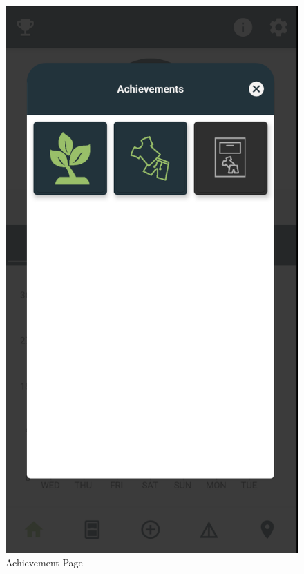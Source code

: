 \documentclass[a4paper, 11pt]{article}
\begin{document}
        \begin{figure}[!htbp]
          \begin{minipage}[scale=0.45]{0.45\linewidth}
            \centering
            \includegraphics[scale=0.3]{home-achievements.png}
            \caption{Achievement Page}
          \end{minipage}
          \hfill
          \begin{minipage}[scale=0.45]{0.45\linewidth}

\end{minipage}
\end{figure}
\end{document}
